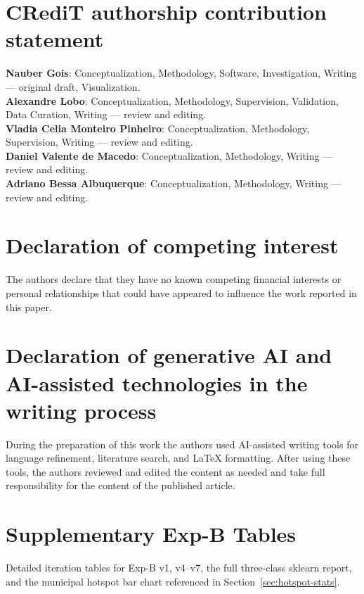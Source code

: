 \documentclass[preprint,12pt,times,numbers]{elsarticle}
\begin{document}
\section*{CRediT authorship contribution statement}
\label{sec:credit}

\textbf{Nauber Gois}: Conceptualization, Methodology, Software, Investigation, Writing --- original draft, Visualization.\\
\textbf{Alexandre Lobo}: Conceptualization, Methodology, Supervision, Validation, Data Curation, Writing --- review and editing.\\
\textbf{Vladia Celia Monteiro Pinheiro}: Conceptualization, Methodology, Supervision, Writing --- review and editing.\\
\textbf{Daniel Valente de Macedo}: Conceptualization, Methodology, Writing --- review and editing.\\
\textbf{Adriano Bessa Albuquerque}: Conceptualization, Methodology, Writing --- review and editing.

\section*{Declaration of competing interest}

The authors declare that they have no known competing financial interests or personal relationships that could have appeared to influence the work reported in this paper.

\section*{Declaration of generative AI and AI-assisted technologies in the writing process}

During the preparation of this work the authors used AI-assisted writing tools for language refinement, literature search, and \LaTeX{} formatting. After using these tools, the authors reviewed and edited the content as needed and take full responsibility for the content of the published article.

\appendix
\section{Supplementary Exp-B Tables}
\label{app:exp-b}

Detailed iteration tables for Exp-B v1, v4--v7, the full three-class sklearn report, and the municipal hotspot bar chart referenced in Section~\ref{sec:hotspot-stats}.





\end{document}
